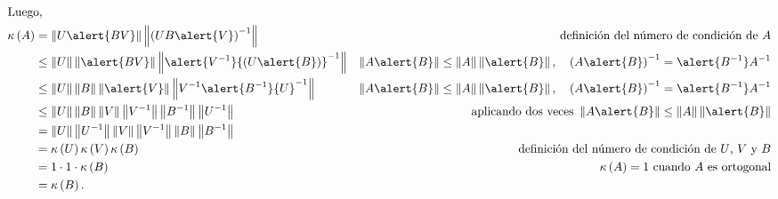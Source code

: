 \documentclass[
	spanish,
	8pt,
	utf8,
	xcolor=table,
	handout,
	aspectratio=169,
	professionalfonts,
	mathserif,
	leqno,
]{beamer}
\begin{document}
\begin{frame}
\begin{solution}
		\begin{align*}
			\shortintertext{Luego,}
			\kappa\left(A\right)                            & =
			\left\|
			U\alert{BV}
			\right\|
			\left\|
			{\left(UB\alert{V}\right)}^{-1}
			\right\|                                        &
			\text{definición del número de condición de $A$}            \\
			                                                & \leq
			\left\|
			U
			\right\|
			\left\|
			\alert{BV}
			\right\|
			\left\|
			\alert{{V}^{-1}}{\left(U\alert{B}\right)}^{-1}
			\right\|                                        &
			\left\|A\alert{B}\right\|\leq
			\left\|A\right\|\left\|\alert{B}\right\|,\quad
			{\left(A\alert{B}\right)}^{-1}=\alert{B^{-1}}A^{-1}         \\
			                                                & \leq
			\left\|U\right\|
			\left\|B\right\|
			\left\|
			\alert{V}
			\right\|
			\left\|{V}^{-1}\alert{{B}^{-1}}{U}^{-1}\right\| &
			\left\|A\alert{B}\right\|\leq
			\left\|A\right\|\left\|\alert{B}\right\|,\quad
			{\left(A\alert{B}\right)}^{-1}=\alert{B^{-1}}A^{-1}         \\
			                                                & \leq
			\left\|U\right\|
			\left\|B\right\|
			\left\|V\right\|
			\left\|{V}^{-1}\right\|
			\left\|{B}^{-1}\right\|
			\left\|{U}^{-1}\right\|                         &
			\text{aplicando dos veces }
			\left\|A\alert{B}\right\|\leq
			\left\|A\right\|\left\|\alert{B}\right\|                    \\
			                                                & =
			\left\|U\right\|
			\left\|{U}^{-1}\right\|
			\left\|V\right\|
			\left\|{V}^{-1}\right\|
			\left\|B\right\|
			\left\|{B}^{-1}\right\|                         &           \\
			                                                & =
			\kappa\left(U\right)
			\kappa\left(V\right)
			\kappa\left(B\right)                            &
			\text{definición del número de condición de $U$, $V$ y $B$} \\
			                                                & =
			1\cdot 1\cdot\kappa\left(B\right)               &
			\text{$\kappa\left(A\right)=1$ cuando $A$ es ortogonal}     \\
			                                                & =
			\kappa\left(B\right).
		\end{align*}
	\end{solution}
\end{frame}
\end{document}
